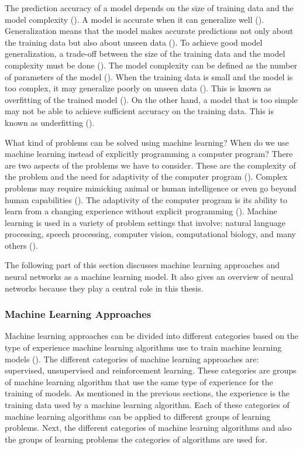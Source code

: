 \documentclass{BachelorBUI}
\begin{document}
        The prediction accuracy of a model depends on the size of training data and the model complexity (\cite{Murphy:2022}). A model is accurate when it can generalize well (\cite{Mohri:2018}). Generalization means that the model makes accurate predictions not only about the training data but also about unseen data (\cite{Bishop:2006}). To achieve good model generalization, a trade-off between the size of the training data and the model complexity must be done (\cite{Bishop:2006,Mohri:2018}). The model complexity can be defined as the number of parameters of the model (\cite{Bishop:2006}). When the training data is small and the model is too complex, it may generalize poorly on unseen data (\cite{Mohri:2018}). This is known as overfitting of the trained model (\cite{Mohri:2018}). On the other hand, a model that is too simple may not be able to achieve sufficient accuracy on the training data. This is known as underfitting (\cite{Mohri:2018}).

        What kind of problems can be solved using machine learning? When do we use machine learning instead of explicitly programming a computer program? There are two aspects of the problems we have to consider. These are the complexity of the problem and the need for adaptivity of the computer program (\cite{Shalev-Shwart:2014}). Complex problems may require mimicking animal or human intelligence or even go beyond human capabilities (\cite{Shalev-Shwart:2014}). The adaptivity of the computer program is its ability to learn from a changing experience without explicit programming (\cite{Shalev-Shwart:2014}). Machine learning is used in a variety of problem settings that involve: natural language processing, speech processing, computer vision, computational biology, and many others (\cite{Mohri:2018}).

        The following part of this section discusses machine learning approaches and neural networks as a machine learning model. It also gives an overview of neural networks because they play a central role in this thesis.

        \subsubsection{Machine Learning Approaches}

            Machine learning approaches can be divided into different categories based on the type of experience machine learning algorithms use to train machine learning models (\cite{Goodfellow:2016}). The different categories of machine learning approaches are: supervised, unsupervised and reinforcement learning. These categories are groups of machine learning algorithm that use the same type of experience for the training of models. As mentioned in the previous sections, the experience is the training data used by a machine learning algorithm. Each of these categories of machine learning algorithms can be applied to different groups of learning problems. Next, the different categories of machine learning algorithms and also the groups of learning problems the categories of algorithms are used for.
\end{document}
